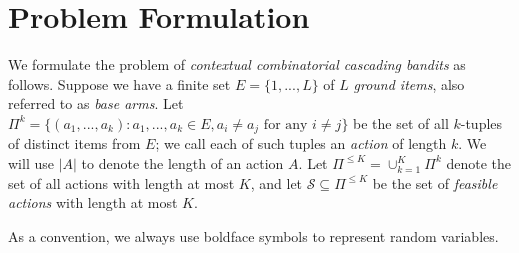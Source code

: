 \documentclass{article}
\newcommand{\EE}{\mathbb{E}}
\newcommand{\RR}{\mathbb{R}}
\newcommand{\bA}{\mathbf{A}}
\newcommand{\br}{\mathbf{r}}
\newcommand{\bw}{\mathbf{w}}
\newcommand{\cS}{\mathcal{S}}
\newcommand{\argmax}{\mathrm{argmax}}
\newcommand{\abs}[1]{\left| #1 \right|}
\begin{document}

\section{Problem Formulation}

We formulate the problem of {\em contextual combinatorial cascading bandits} as follows. Suppose we have a finite set $E=\{1,...,L\}$ of $L$ \textit{ground items}, also referred to as {\em base arms}. Let $\Pi^k=\{(a_1,...,a_k): a_1,...,a_k \in E, a_i \neq a_j \text{ for any } i \neq j\}$ be the set of all $k$-tuples of distinct items from $E$; we call each of such tuples an {\em action} of length $k$. We will use $|A|$ to denote the length of an action $A$. Let $\Pi^{\leq K}= \cup_{k=1}^K \Pi^{k}$ denote the set of all actions with length at most $K$, and let $\cS \subseteq \Pi^{\leq K}$ be the set of \textit{feasible actions} with length at most $K$.

As a convention, we always use boldface symbols to represent random variables.
\end{document}
